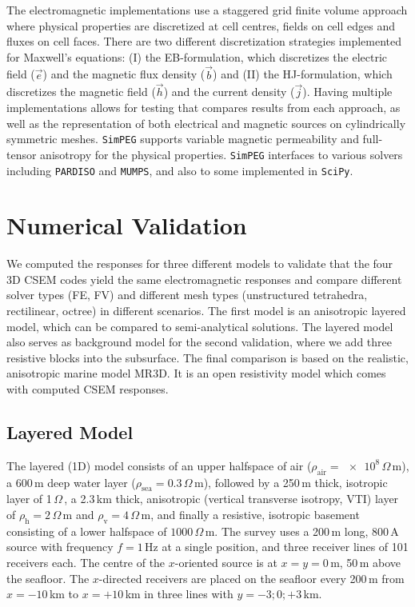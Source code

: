 \documentclass[
    paper,
  ]{geophysics}
\newcommand{\simpeg}{\texttt{SimPEG}\xspace}
\newcommand{\ohmm}{\ensuremath{\Omega\,}\text{m}\xspace}
\begin{document}
The electromagnetic implementations use a staggered grid finite volume approach where physical properties are discretized at cell centres, fields on cell edges and fluxes on cell faces. There are two different discretization strategies implemented for Maxwell's equations: (I) the EB-formulation, which discretizes the electric field ($\vec{e}$) and the magnetic flux density ($\vec{b}$) and (II) the HJ-formulation, which discretizes the magnetic field ($\vec{h}$) and the current density ($\vec{j}$). Having multiple implementations allows for testing that compares results from each approach, as well as the representation of both electrical and magnetic sources on cylindrically symmetric meshes. \simpeg supports variable magnetic permeability and full-tensor anisotropy for the physical properties. \simpeg interfaces to various solvers including \texttt{PARDISO} and \texttt{MUMPS}, and also to some implemented in \texttt{SciPy}. 

\section{Numerical Validation}

We computed the responses for three different models to validate that the four 3D CSEM codes yield the same electromagnetic responses and compare different solver types (FE, FV) and different mesh types (unstructured tetrahedra, rectilinear, octree) in different scenarios. The first model is an anisotropic layered model, which can be compared to semi-analytical solutions. The layered model also serves as background model for the second validation, where we add three resistive blocks into the subsurface. The final comparison is based on the realistic, anisotropic marine model MR3D. It is an open resistivity model which comes with computed CSEM responses.

\subsection{Layered Model}

The layered (1D) model consists of an upper halfspace of air ($\rho_\text{air}=\num{e8}\,\ohmm$), a 600\,m deep water layer ($\rho_\text{sea}=\num{0.3}\,\ohmm$), followed by a 250\,m thick, isotropic layer of 1\,\ohmm, a 2.3\,km thick, anisotropic (vertical transverse isotropy, VTI) layer of $\rho_\text{h}=2\,\ohmm$ and $\rho_\text{v}=4\,\ohmm$, and finally a resistive, isotropic basement consisting of a lower halfspace of $1000\,\ohmm$. The survey uses a 200\,m long, 800\,A source  with frequency $f=1\,$Hz at a single position, and three receiver lines of 101 receivers each. The centre of the $x$-oriented source is at $x=y=0\,$m, 50\,m above the seafloor. The $x$-directed receivers are placed on the seafloor every 200\,m from $x=-10\,$km to $x=+10\,$km in three lines with $y=-3; 0; +3\,$km.
\end{document}
